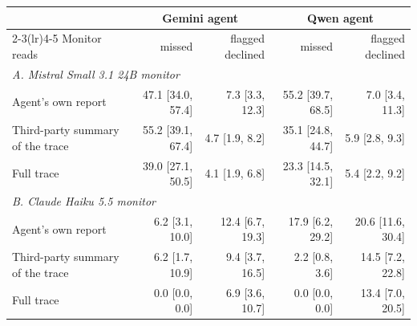 \begin{tabular}{lrrrr}
\toprule
 & \multicolumn{2}{c}{Gemini agent} & \multicolumn{2}{c}{Qwen agent} \\
\cmidrule(lr){2-3}\cmidrule(lr){4-5}
Monitor reads & missed & flagged declined & missed & flagged declined \\
\midrule
\multicolumn{5}{l}{\textit{A. Mistral Small 3.1 24B monitor}} \\
Agent's own report & 47.1 {\scriptsize[34.0, 57.4]} & 7.3 {\scriptsize[3.3, 12.3]} & 55.2 {\scriptsize[39.7, 68.5]} & 7.0 {\scriptsize[3.4, 11.3]} \\
Third-party summary of the trace & 55.2 {\scriptsize[39.1, 67.4]} & 4.7 {\scriptsize[1.9, 8.2]} & 35.1 {\scriptsize[24.8, 44.7]} & 5.9 {\scriptsize[2.8, 9.3]} \\
Full trace & 39.0 {\scriptsize[27.1, 50.5]} & 4.1 {\scriptsize[1.9, 6.8]} & 23.3 {\scriptsize[14.5, 32.1]} & 5.4 {\scriptsize[2.2, 9.2]} \\
\midrule
\multicolumn{5}{l}{\textit{B. Claude Haiku 5.5 monitor}} \\
Agent's own report & 6.2 {\scriptsize[3.1, 10.0]} & 12.4 {\scriptsize[6.7, 19.3]} & 17.9 {\scriptsize[6.2, 29.2]} & 20.6 {\scriptsize[11.6, 30.4]} \\
Third-party summary of the trace & 6.2 {\scriptsize[1.7, 10.9]} & 9.4 {\scriptsize[3.7, 16.5]} & 2.2 {\scriptsize[0.8, 3.6]} & 14.5 {\scriptsize[7.2, 22.8]} \\
Full trace & 0.0 {\scriptsize[0.0, 0.0]} & 6.9 {\scriptsize[3.6, 10.7]} & 0.0 {\scriptsize[0.0, 0.0]} & 13.4 {\scriptsize[7.0, 20.5]} \\
\bottomrule
\end{tabular}
